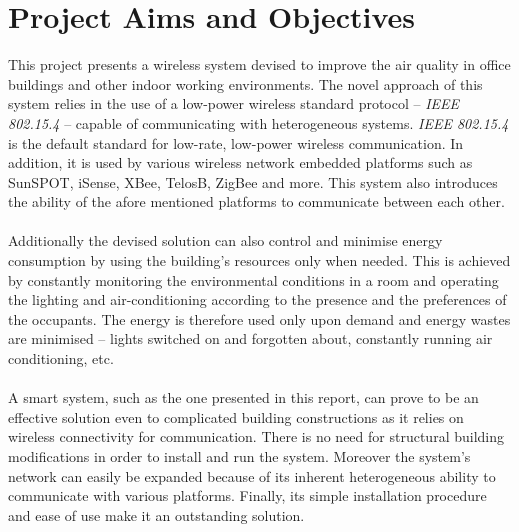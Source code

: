 \documentclass[12pt,a4paper]{report}
\begin{document}
\section{Project Aims and Objectives}
This project presents a wireless system devised to improve the air quality in office buildings and other indoor working environments. The novel approach of this system relies in the use of a low-power wireless standard protocol -- \textit{IEEE 802.15.4} -- capable of communicating with heterogeneous systems. \textit{IEEE 802.15.4} is the default standard for low-rate, low-power wireless communication. In addition, it is used by various wireless network embedded platforms such as SunSPOT, iSense, XBee, TelosB, ZigBee and more. This system also introduces the ability of the afore mentioned platforms to communicate between each other.\\
\ \\   
Additionally the devised solution can also control and minimise energy consumption by using the building's resources only when needed.
This is achieved by constantly monitoring the environmental conditions in a room and operating the lighting and air-conditioning according to the presence and the preferences of the occupants. 
The energy is therefore used only upon demand and energy wastes are minimised -- lights switched on and forgotten about, constantly running air conditioning, etc.\\
\ \\
A smart system, such as the one presented in this report, can prove to be an effective solution even to complicated building constructions as it relies on wireless connectivity for communication. 
There is no need for structural building modifications in order to install and run the system.
Moreover the system's network can easily be expanded because of its inherent heterogeneous ability to communicate with various platforms. 
Finally, its simple installation procedure and ease of use make it an outstanding solution.
%
\end{document}
